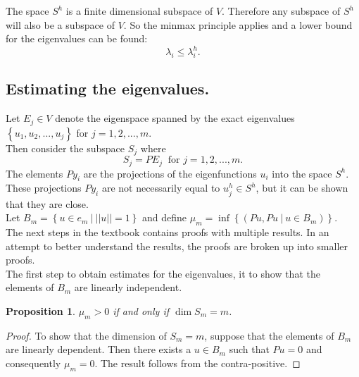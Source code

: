 \documentclass[../../main.tex]{subfiles}
\begin{document}
The space $S^h$\label{sym:Sh1} is a finite dimensional subspace of $V$. Therefore any subspace of $S^h$ will also be a subspace of $V$. So the minmax principle applies and a lower bound for the eigenvalues can be found:
\begin{equation}
	\lambda_i \leq \lambda_i^h.
\end{equation}


\subsection{Estimating the eigenvalues.}
Let $E_j \in V$ denote the eigenspace spanned by the exact eigenvalues $\left\{u_1,u_2,...,u_j \right\}$ for $j = 1,2,...,m$.\\

Then consider the subspace $S_j$ where
\begin{equation*}
	S_j = PE_j \ \text{ for } j = 1,2,...,m.
\end{equation*} The elements $Py_i$ are the projections of the eigenfunctions $u_i$ into the space $S^h$. These projections $Py_i$ are not necessarily equal to $u^h_j \in S^h$, but it can be shown that they are close.\\

Let $B_m = \left\{u \in e_m \ | \ ||u|| = 1 \right\}$ and define $\mu_m = \inf\left\{(Pu,Pu \ | \ u \in B_m)\right\}$.\\

The next steps in the textbook \cite{SF73} contains proofs with multiple results. In an attempt to better understand the results, the proofs are broken up into smaller proofs.\\

The first step to obtain estimates for the eigenvalues, it to show that the elements of $B_m$ are linearly independent.

\newtheorem{Prop_1}{Proposition}
\begin{Prop_1}
 $\mu_{m} > 0$ if and only if $\dim S_{m} = m$. \label{sym:mu}
\end{Prop_1}
\begin{proof}
	To show that the dimension of $S_m = m$, suppose that the elements of $B_m$ are linearly dependent. Then there exists a $u \in B_m$ such that $Pu = 0$ and consequently $\mu_m = 0$. The result follows from the contra-positive.
\end{proof}
\end{document}
